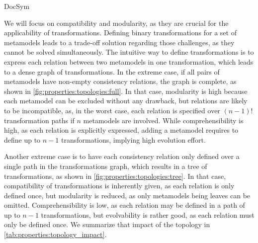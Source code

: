 \begin{copiedFrom}{DocSym}

We will focus on compatibility and modularity, as they are crucial for the applicability of transformations. %
Defining binary transformations %
for a set of metamodels leads to a trade-off solution regarding those challenges, as they cannot be solved simultaneously.
The intuitive way to define transformations %
is to express each relation between two metamodels in one transformation, which leads to a dense graph of transformations. %
In the extreme case, if all pairs of metamodels have non-empty consistency relations, the graph is complete, as shown in \autoref{fig:properties:topologies:full}.
In that case, modularity is high because each metamodel can be excluded without any drawback, %
but relations are likely to be incompatible, as, in the worst case, each relation is specified over $(n-1)!$ transformation paths if $n$ metamodels are involved.
While comprehensibility is high, as each relation is explicitly expressed, adding a metamodel requires to define up to $n-1$ transformations, implying high evolution effort.

Another extreme case is to have each consistency relation only defined over a single path in the transformations graph, which results in a tree of transformations, as shown in \autoref{fig:properties:topologies:tree}.
In that case, compatibility of transformations is inherently given, as each relation is only defined once, but modularity is reduced, as only metamodels being leaves can be omitted.
Comprehensibility is low, as each relation may be defined in a path of up to $n-1$ transformations, but evolvability is rather good, as each relation must only be defined once. %
We summarize that impact of the topology in \autoref{tab:properties:topology_impact}.


\end{copiedFrom}
